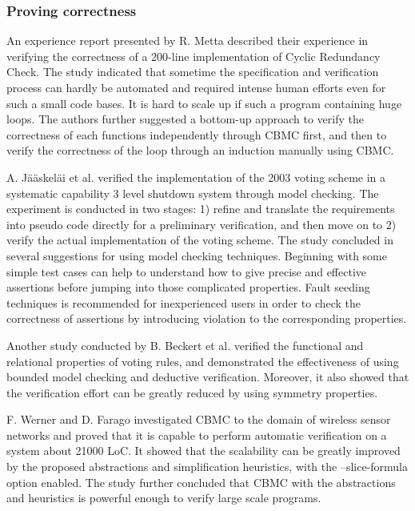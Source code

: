 \subsubsection{Proving correctness}
An experience report presented by R. Metta \cite{Metta:2011:VCO:2004685.2005455} described their experience in verifying the correctness of a 200-line implementation of Cyclic Redundancy Check. The study indicated that sometime the specification and verification process can hardly be automated and required intense human efforts even for such a small code bases. It is hard to scale up if such a program containing huge loops. The authors further suggested a bottom-up approach to verify the correctness of each functions independently through CBMC first, and then to verify the correctness of the loop through an induction manually using CBMC. 

A. J{\"a}{\"a}skel{\"a}i et al. \cite{jskelinen_et_al:OASIcs:2012:3589} verified the implementation of the 2003 voting scheme in a systematic capability 3 level shutdown system through model checking. The experiment is conducted in two stages: 1) refine and translate the requirements into pseudo code directly for a preliminary verification, and then move on to 2) verify the actual implementation of the voting scheme. The study concluded in several suggestions for using model checking techniques. Beginning with some simple test cases can help to understand how to give precise and effective assertions before jumping into those complicated properties. Fault seeding techniques is recommended for inexperienced users in order to check the correctness of assertions by introducing violation to the corresponding properties. 

Another study conducted by B. Beckert et al. \cite{beckertBormerKirsten2016} verified the functional and relational properties of voting rules, and demonstrated the effectiveness of using bounded model checking and deductive verification. Moreover, it also showed that the verification effort can be greatly reduced by using symmetry properties. 

F. Werner and D. Farago \cite{Werner2010CorrectnessOS} investigated CBMC to the domain of wireless sensor networks and proved that it is capable to perform automatic verification on a system about 21000 LoC. It showed that the scalability can be greatly improved by the proposed abstractions and simplification heuristics, with the --slice-formula option enabled. The study further concluded that CBMC with the abstractions and heuristics is powerful enough to verify large scale programs. 

